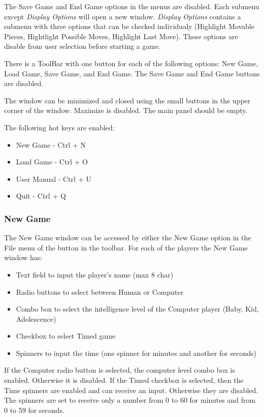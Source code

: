 		The Save Game and End Game options in the menus are disabled.
		Each submenu except \textit{Display Options} will open a new window. 
		\textit{Display Options} contains a submenu with three options that can be 
		checked individualy (Highlight Movable Pieces, Hightlight Possible Moves, 
		Highlight Last Move). These options are disable from user selection before 
		starting a game.
		
		There is a ToolBar with one button for each of the following options:
		New Game, Load Game, Save Game, and End Game. The Save Game and End Game
		buttons are disabled.
		
		The window can be minimized and closed using the small buttons in the
		upper corner of the window. Maximize is disabled. The main panel 
		should be empty.
		
		The following hot keys are enabled:
				\begin{itemize}
					\item New Game - Ctrl + N
					\item Load Game - Ctrl + O
					\item User Manual - Ctrl + U
					\item Quit - Ctrl + Q
				\end{itemize}		
		 
		 
		\subsubsection{New Game}
			The New Game window can be accessed by either the New Game option in 
			the File menu of the button in the toolbar. For each of the players
			the New Game window has:
			\begin{itemize}
					\item Text field to input the player's name (max 8 char)
					\item Radio buttons to select between Human or Computer
					\item Combo box to select the intelligence level of the Computer
								player (Baby, Kid, Adolescence)
					\item Checkbox to select Timed game 
					\item Spinners to input the time (one spinner for minutes and 
								another for seconds)
				\end{itemize}
			If the Computer radio button is selected, the computer level combo box is enabled.
			Otherwise it is disabled. If the Timed checkbox is selected, then the 
			Time spinners are enabled and can receive an input. Otherwise they 
			are disabled. The spinners are set to receive only a number from 0 to 60 for 
			minutes and from 0 to 59 for seconds.
			
